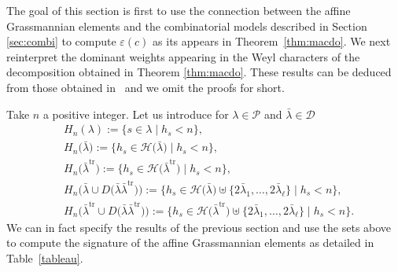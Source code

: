 \documentclass[pdftex]{sigma}
\numberwithin{equation}{section}
\def\cch{\mathcal H}
\def\ccd{\mathcal {D}}
\def\ccp{\mathcal P}
\begin{document}
The goal of this section is first to use the connection between the affine Grassmannian elements and the combinatorial models described in Section \ref{sec:combi} to compute $\varepsilon(c)$ as its appears in Theorem~\ref{thm:macdo}. We next reinterpret the dominant weights appearing in the Weyl characters of the decomposition obtained in Theorem \ref{thm:macdo}. These results can be deduced from those obtained in~\cite{Wmac} and we omit the proofs for short.

Take $n$ a positive integer. Let us introduce for $\lambda\in\ccp$ and $\bar{\lambda}\in\ccd$
\begin{align*}
& H_n(\lambda):=\lbrace s\in\lambda\mid h_s<n\rbrace,\\
& H_n\bigl(\bar{\lambda}\bigr):=\bigl\lbrace h_s \in\cch\bigl(\bar{\lambda}\bigr)\mid h_s<n\bigr\rbrace,\\
& H_n\bigl(\bar{\lambda}^\mathrm{tr}\bigr):=\bigl\lbrace h_s \in\cch\bigl(\bar{\lambda}^{\mathrm{tr}}\bigr)\mid h_s<n\bigr\rbrace,\\
& H_n\bigl(\bar{\lambda}\cup D\bigl(\bar{\lambda}\bar{\lambda}^\mathrm{tr}\bigr)\bigr):=\bigl\lbrace h_s \in\cch\bigl(\bar{\lambda}\bigr)\uplus\bigl\lbrace 2\bar{\lambda}_1,\dots,2\bar{\lambda}_\ell\bigr\rbrace\mid h_s<n\bigr\rbrace,\\
& H_n\bigl(\bar{\lambda}^{\mathrm{tr}}\cup D\bigl(\bar{\lambda}\bar{\lambda}^\mathrm{tr}\bigr)\bigr):=\bigl\lbrace h_s \in\cch\bigl(\bar{\lambda}^{\mathrm{tr}}\bigr)\uplus\bigl\lbrace 2\bar{\lambda}_1,\dots,2\bar{\lambda}_\ell\bigr\rbrace\mid h_s<n\bigr\rbrace.
\end{align*}
We can in fact specify the results of the previous section and use the sets above to compute the signature of the affine Grassmannian elements as detailed in Table~\ref{tableau}.
\end{document}
